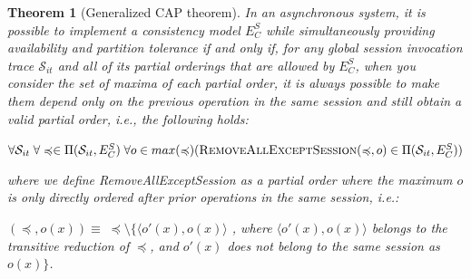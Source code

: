 \documentclass[journal, compsoc]{IEEEtran}
\newtheorem{theorem}{Theorem}[section]
\begin{document}
	\begin{theorem}[Generalized CAP theorem]\label{thrm:capan}
		In an asynchronous system, it is possible to implement a consistency model $E^S_C$ while simultaneously providing availability and partition tolerance if and only if, for any global session invocation trace $\mathcal{S}_{it}$ and all of its partial orderings that are allowed by $E^S_C$, when you consider the set of maxima of each partial order, it is always possible to make them depend only on the previous operation in the same session and still obtain a valid partial order, i.e., the following holds:
		
		
		$\forall \mathcal{S}_{it} \; \forall \preccurlyeq \in \Pi(\mathcal{S}_{it},E^S_C) \; \forall o \in max(\preccurlyeq) \\ (\textsc{RemoveAllExceptSession}(\preccurlyeq,o) \in \Pi(\mathcal{S}_{it},E^S_C) ) $
		
		where we define {\sc RemoveAllExceptSession} as a partial order where the maximum $o$ is only directly ordered after prior operations in the same session, i.e.:
		
		$(\preccurlyeq,o(x)) \equiv \; \preccurlyeq \setminus \{ \langle o'(x),o(x) \rangle$ , where $\langle o'(x),o(x) \rangle$ belongs to the transitive reduction of $\preccurlyeq$, and $o'(x)$ does not belong to the same session as $o(x)\}$.
		
		
		
	\end{theorem}
	
\end{document}

